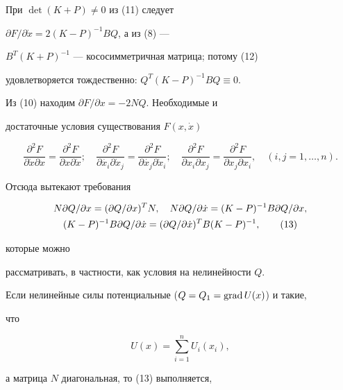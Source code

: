 При $\det(K+P)\ne 0$ из (11) следует


$\partial F/ \partial \Dot{x}=2(K-P)^{-1}BQ$, а из (8) ---


$B^{T}(K+P)^{-1}$ --- кососимметричная матрица; потому (12)


удовлетворяется тождественно: $Q^{T}(K-P)^{-1}BQ\equiv 0$.


Из (10) находим $\partial F /\partial x =-2NQ$. Необходимые и


достаточные условия существования $F(x,\Dot x)$


$$


\frac{\partial^{2} F }{\partial \Dot{x}\partial x}=


\frac{\partial^{2} F }{\partial x\partial \Dot x};\quad


\frac{\partial^{2} F }{\partial \Dot{x_{i}}\partial \Dot x_{j}}=


\frac{\partial^{2} F }{\partial \Dot{x_{j}}\partial \Dot x_{i}};\quad


\frac{\partial^{2} F }{\partial x_{i}\partial x_{j}}=


\frac{\partial^{2} F }{\partial x_{j}\partial x_{i}}, \quad


(i,j=1,\dotsc,n).


$$


Отсюда вытекают требования


\begin{gather}


N\partial Q/\partial x=(\partial Q/\partial x)^{T}N,\quad


N\partial Q/\partial \Dot x = (K-P)^{-1}B\partial Q/\partial x,\notag \\


%


(K-P)^{-1}B\partial Q/\partial \Dot x=


(\partial Q/\partial \Dot x )^{T}B(K-P)^{-1}, \tag{13}


\end{gather}


которые можно


рассматривать, в частности, как условия на нелинейности $Q$.


Если нелинейные силы потенциальные ($Q=Q_{1}=\operatorname{grad} U(x)$) и такие,


что


$$


U(x)=\sum_{i=1}^{n}U_{i}(x_{i}),


$$


а матрица $N$ диагональная, то (13) выполняется,


